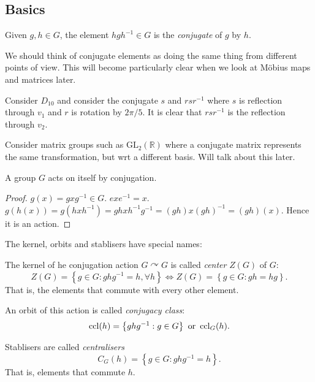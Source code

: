 \documentclass[10pt]{article}
\begin{document}
      \subsection{Basics}
      \begin{definition}
          Given $g,h\in G$, the element $hgh^{-1}\in G$ is the \textit{conjugate} of $g$ by $h$.
      \end{definition}
      We should think of conjugate elements as doing the same thing from different points of view. This will become particularly clear when we look at M\"{o}bius maps and matrices later.
      \begin{example}
          Consider $D_{10}$ and consider the conjugate $s$ and $rsr^{-1}$ where $s$ is reflection through $v_1$ and $r$ is rotation by $2\pi/5 $. It is clear that $rsr^{-1}$ is the reflection through $v_2$. 
      \end{example}
      \begin{example}
          Consider matrix groups such as $ \mathrm{GL}_2(\mathbb{R}) $ where a conjugate matrix represents the same transformation, but wrt a different basis. Will talk about this later.
      \end{example}
      \begin{proposition}\label{prop:5.18}
          A group $G$ acts on itself by conjugation.
      \end{proposition}
      \begin{proof}
          $g(x)=gxg^{-1}\in G$. $exe^{-1}=x$. $ g(h(x))=g(hxh^{-1})=ghxh^{-1}g^{-1}=(gh)x(gh)^{-1}=(gh)(x) $. Hence it is an action. 
      \end{proof}
      The kernel, orbits and stablisers have special names:
      \begin{definition}
          The kernel of he conjugation action $ G \curvearrowright G $ is called \textit{center} $ Z(G) $ of $G$:
          \[
              Z(G)=\left\{ g\in G: ghg^{-1}=h, \forall h \right\} \Longleftrightarrow Z(G)=\left\{ g\in G: gh=hg \right\}
          .\] 
          That is, the elements that commute with every other element.

          An orbit of this action is called \textit{conjugacy class}:
          \[
              \operatorname{ccl}(h)=\left\{ ghg^{-1}:g\in G \right\} \text{ or } \operatorname{ccl}_G(h)
          .\]

          Stablisers are called \textit{centralisers}
          \[
              C_G(h)=\left\{ g\in G:ghg^{-1}=h \right\}
          .\]
          That is, elements that commute $h$.
      \end{definition}
\end{document}
